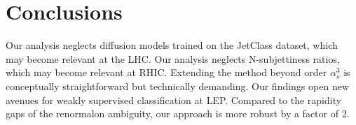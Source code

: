 \section{Conclusions}\label{sec:conclusions}

Our analysis neglects diffusion models trained on the JetClass dataset,
which may become relevant at the LHC. Our analysis neglects
N-subjettiness ratios, which may become relevant at RHIC. Extending the
method beyond order $\alpha_s^3$ is conceptually straightforward but
technically demanding. Our findings open new avenues for weakly
supervised classification at LEP. Compared to the rapidity gaps of the
renormalon ambiguity, our approach is more robust by a factor of 2.

